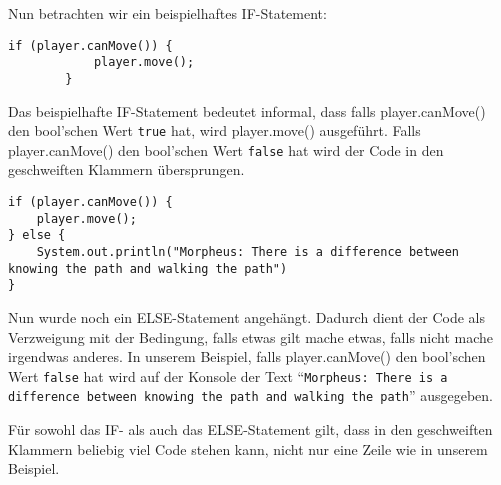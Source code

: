 \begin{Infobox}[IF-Verzweigung]
    Nun betrachten wir ein beispielhaftes IF-Statement:

    \begin{lstlisting}[breaklines=true, numbers=none]
        if (player.canMove()) {
            player.move();
        }
    \end{lstlisting}

    Das beispielhafte IF-Statement bedeutet informal, dass falls player.canMove() den bool'schen Wert \lstinline{true} hat, wird player.move() ausgeführt. Falls player.canMove() den bool'schen Wert \lstinline{false} hat wird der Code in den geschweiften Klammern übersprungen.

    \begin{lstlisting}[breaklines=true, numbers=none]
if (player.canMove()) {
    player.move();
} else {
    System.out.println("Morpheus: There is a difference between knowing the path and walking the path")
}
    \end{lstlisting}

    Nun wurde noch ein ELSE-Statement angehängt. Dadurch dient der Code als Verzweigung mit der Bedingung, falls etwas gilt mache etwas, falls nicht mache irgendwas anderes. In unserem Beispiel, falls player.canMove() den bool'schen Wert \lstinline{false} hat wird auf der Konsole der Text \enquote{\texttt{Morpheus: There is a difference between knowing the path and walking the path}} ausgegeben.\newline

    Für sowohl das IF- als auch das ELSE-Statement gilt, dass in den geschweiften Klammern beliebig viel Code stehen kann, nicht nur eine Zeile wie in unserem Beispiel.
\end{Infobox}



